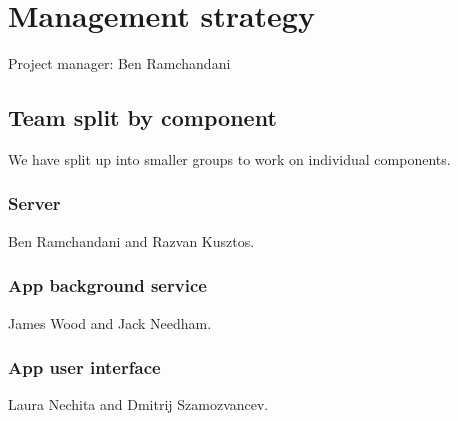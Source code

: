 \documentclass[a4paper,10pt]{article}
\begin{document}
\section{Management strategy}

Project manager: Ben Ramchandani

\subsection{Team split by component}

We have split up into smaller groups to work on individual components.

\subsubsection{Server}

Ben Ramchandani and Razvan Kusztos.

\subsubsection{App background service}

James Wood and Jack Needham.

\subsubsection{App user interface}

Laura Nechita and Dmitrij Szamozvancev.
\end{document}
